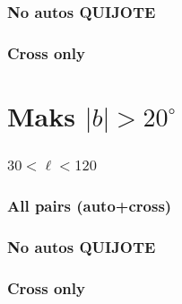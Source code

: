 

\subsubsection*{No autos QUIJOTE}



\subsubsection*{Cross only}



\clearpage



\section{Maks $|b| > 20^{\circ}$}

\subsubsection*{$30 < \ell < 120$}

\subsubsection*{All pairs (auto+cross)}



\subsubsection*{No autos QUIJOTE}




\subsubsection*{Cross only}




